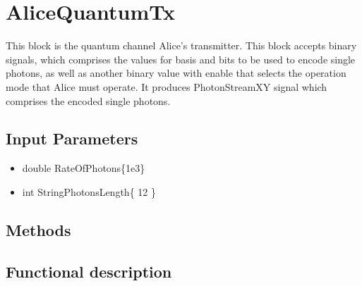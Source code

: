 \clearpage

\section{AliceQuantumTx}

\maketitle
This block is the quantum channel Alice's transmitter. This block accepts binary signals, which comprises the values for basis and bits to be used to encode single photons, as well as another binary value with enable that selects the operation mode that Alice must operate. It produces PhotonStreamXY signal which comprises the encoded single photons.


\subsection*{Input Parameters}

	\begin{itemize}
		\item double RateOfPhotons\{1e3\}
	
		\item int StringPhotonsLength\{ 12 \}
	\end{itemize}

\subsection*{Methods}


\subsection*{Functional description}

